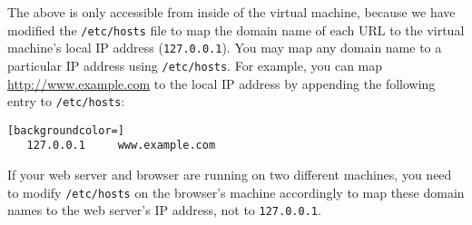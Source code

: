 

The above \urlisorurlsare is only accessible from inside of the virtual machine, because we
have modified the \texttt{/etc/hosts} file to map the domain
name of each URL to the virtual machine's local IP
address ({\tt 127.0.0.1}).
You may map any domain name to a particular IP address using
\texttt{/etc/hosts}. For example, you can map
\url{http://www.example.com} to the local IP address by appending the
following entry to \texttt{/etc/hosts}:

\begin{lstlisting}[backgroundcolor=]
   127.0.0.1     www.example.com
\end{lstlisting}

If your web server and browser are running on two different machines, you need
to modify \texttt{/etc/hosts} on the browser's machine accordingly to map these
domain names to the web server's IP address, not to {\tt 127.0.0.1}.


